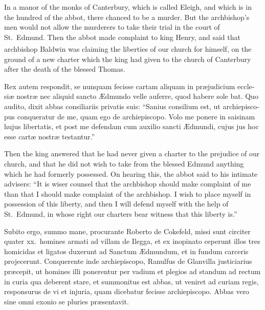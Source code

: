 \documentclass[10pt]{book}
\newcounter{engnote}
\newcommand{\engnotenum}{\textsuperscript{\arabic{engnote}\stepcounter{engnote}}}
\begin{document}
\begin{paracol}{2}
\begin{otherlanguage}{latin}
\end{otherlanguage}

\switchcolumn

In a manor of the monks of Canterbury, which is called Eleigh, and which is in the hundred of the abbot, there chanced to be a murder. But the archbishop's men would not allow the murderers to take their trial in the court of St.\ Edmund. Then the abbot made complaint to king Henry, and said that archbishop Baldwin\engnotenum{} was claiming the liberties of our church for himself, on the ground of a new charter which the king had given to the church of Canterbury after the death of the blessed Thomas.

\switchcolumn*

\begin{otherlanguage}{latin}
Rex autem respondit, se nunquam fecisse cartam aliquam in pr\ae{}judicium ecclesi\ae{} nostr\ae{} nec aliquid sancto \AE{}dmundo velle auferre, quod habere sole bat. Quo audito, dixit abbas consiliariis privatis suis: ``Sanius consilium est, ut archiepiscopus conqueratur de me, quam ego de archiepiscopo. Volo me ponere in saisinam hujus libertatis, et post me defendam cum auxilio sancti \AE{}dmundi, cujus jus hoc esse cart\ae{} nostr\ae{} testantur.''
\end{otherlanguage}

\switchcolumn

Then the king answered that he had never given a charter to the prejudice of our church, and that he did not wish to take from the blessed Edmund anything which he had formerly possessed. On hearing this, the abbot said to his intimate advisers: ``It is wiser counsel that the archbishop should make complaint of me than that I should make complaint of the archbishop. I wish to place myself in possession of this liberty, and then I will defend myself with the help of St.\ Edmund, in whose right our charters bear witness that this liberty is.''

\switchcolumn*

\begin{otherlanguage}{latin}
Subito ergo, summo mane, procurante Roberto de Cokefeld, missi sunt circiter quater xx.\ homines armati ad villam de Ilegga, et ex inopinato ceperunt illos tres homicidas et ligatos duxerunt ad Sanctum \AE{}dmundum, et in fundum carceris projecerunt. Conquerente inde archiepiscopo, Ranulfus de Glanvilla justiciarius pr\ae{}cepit, ut homines illi ponerentur per vadium et plegios ad standum ad rectum in curia qua deberent stare, et summonitus est abbas, ut veniret ad curiam regis, responsurus de vi et injuria, quam dicebatur fecisse archiepiscopo. Abbas vero sine omni exonio se pluries pr\ae{}sentavit.
\end{otherlanguage}


\end{paracol}
\end{document}
